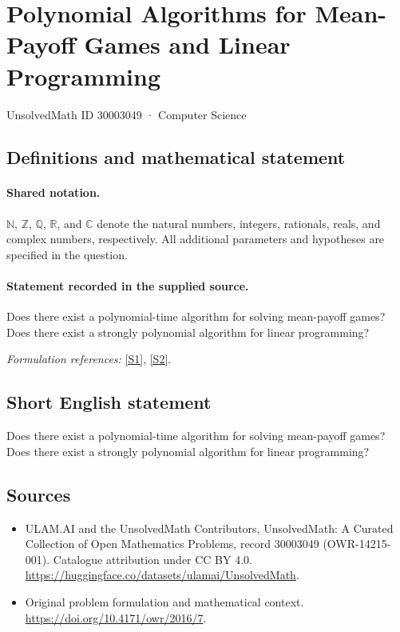 \documentclass[11pt]{article}
\newcommand{\sref}[2]{\hyperlink{source:#1:#2}{[S#2]}}
\begin{document}
\setcounter{section}{30003048}
\section{Polynomial Algorithms for Mean-Payoff Games and Linear Programming}\label{30003049}
{\small UnsolvedMath ID 30003049 · Computer Science}
\subsection{Definitions and mathematical statement}

\paragraph{Shared notation.}$\mathbb N$, $\mathbb Z$, $\mathbb Q$, $\mathbb R$, and $\mathbb C$ denote the natural numbers, integers, rationals, reals, and complex numbers, respectively. All additional parameters and hypotheses are specified in the question.


\paragraph{Statement recorded in the supplied source.}
Does there exist a polynomial-time algorithm for solving mean-payoff games? Does there exist a strongly polynomial algorithm for linear programming?
\par\smallskip\textit{Formulation references:} \sref{30003049}{1}, \sref{30003049}{2}.
\subsection{Short English statement}
Does there exist a polynomial-time algorithm for solving mean-payoff games? Does there exist a strongly polynomial algorithm for linear programming?
\subsection{Sources}
\begin{itemize}
\item[\hypertarget{source:30003049:1}{S1}] ULAM.AI and the UnsolvedMath Contributors, UnsolvedMath: A Curated Collection of Open Mathematics Problems, record 30003049 (OWR-14215-001). Catalogue attribution under CC BY 4.0.
\url{https://huggingface.co/datasets/ulamai/UnsolvedMath}.
\item[\hypertarget{source:30003049:2}{S2}] Original problem formulation and mathematical context.
\url{https://doi.org/10.4171/owr/2016/7}.
\end{itemize}
\label{end:30003049}
\end{document}
